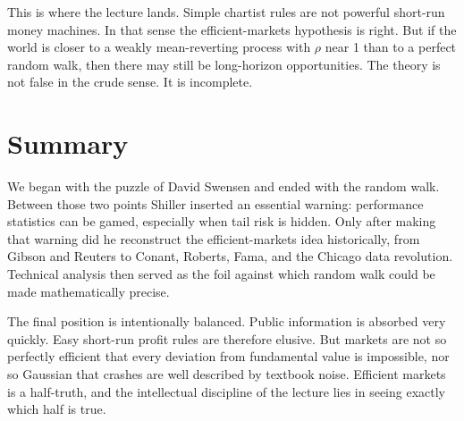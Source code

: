 This is where the lecture lands. Simple chartist rules are not powerful short-run money machines. In that sense the efficient-markets hypothesis is right. But if the world is closer to a weakly mean-reverting process with \(\rho\) near 1 than to a perfect random walk, then there may still be long-horizon opportunities. The theory is not false in the crude sense. It is incomplete.

\section{Summary}

We began with the puzzle of David Swensen and ended with the random walk. Between those two points Shiller inserted an essential warning: performance statistics can be gamed, especially when tail risk is hidden. Only after making that warning did he reconstruct the efficient-markets idea historically, from Gibson and Reuters to Conant, Roberts, Fama, and the Chicago data revolution. Technical analysis then served as the foil against which random walk could be made mathematically precise.

The final position is intentionally balanced. Public information is absorbed very quickly. Easy short-run profit rules are therefore elusive. But markets are not so perfectly efficient that every deviation from fundamental value is impossible, nor so Gaussian that crashes are well described by textbook noise. Efficient markets is a half-truth, and the intellectual discipline of the lecture lies in seeing exactly which half is true.